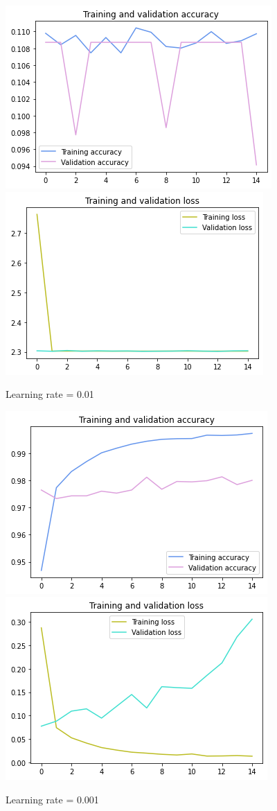 \documentclass[12pt,a4paper]{scrartcl}		%
\begin{document}
        \begin{figure}[h]
            \centering
            \includegraphics[scale = 0.5]{acc_01.png}
            \includegraphics[scale = 0.5]{loss_01.png}
            \caption{Learning rate = 0.01}
            \label{fig::cnn01}
        \end{figure} 
        \begin{figure}[h]
            \centering
            \includegraphics[scale = 0.5]{acc_001.png}
            \includegraphics[scale = 0.5]{loss001.png}
            \caption{Learning rate = 0.001}
            \label{fig::cnn001}
        \end{figure} 
\end{document}
